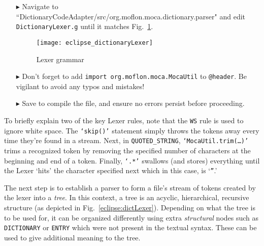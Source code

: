 \begin{itemize}
  
\item[$\blacktriangleright$] Navigate to ``Diction\-ary\-Code\-Adap\-ter/src/org.moflon.moca.dict\-ion\-ary\-.pars\-er" and edit \texttt{DictionaryLexer.g}
until it matches Fig.~\ref{eclipse:dictionaryLexer}. 


\newpage

\begin{figure}[!htbp]
\begin{center}
  \texttt{[image: eclipse\_dictionaryLexer]}
  \caption{Lexer grammar}
  \label{eclipse:dictionaryLexer}
\end{center}
\end{figure}

\item[$\blacktriangleright$] Don't forget to add \texttt{import org.moflon.moca.MocaUtil} to \texttt{@header}. Be vigilant to avoid any typos and mistakes!

\item[$\blacktriangleright$] Save to compile the file, and ensure no errors persist before proceeding.

\end{itemize}

To briefly explain two of the key Lexer rules, note that the \texttt{WS} rule is used to ignore white space. The \texttt{`skip()'} statement simply
throws the tokens away every time they're found in a stream. Next, in \texttt{QUOTED\_STRING}, \texttt{`MocaUtil.trim(\ldots)'} trims a recognized token by
removing the specified number of characters at the beginning and end of a token. Finally, \texttt{`.*'} swallows (and stores) everything until the Lexer `hits'
the character specified next which in this case, is `\texttt{''}.'

\newpage

The next step is to establish a parser to form a file's stream of tokens created by the lexer into a \emph{tree}. In this context, a tree
is an acyclic, hierarchical, recursive structure (as depicted in Fig.~\ref{eclipse:dictLexer}). Depending on what the tree is to be used for, it can be organized differently using extra
\emph{structural} nodes such as \texttt{DICTIONARY} or \texttt{ENTRY} which were not present in the textual syntax. These can be used to give additional
meaning to the tree.

\vspace{0.5cm}

